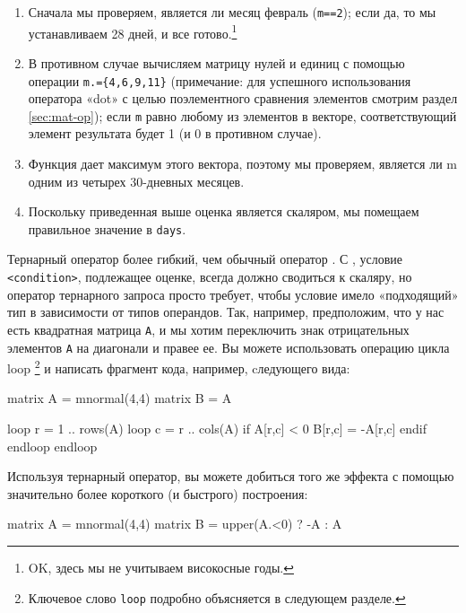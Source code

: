 \begin{enumerate}
\item Сначала мы проверяем, является ли месяц февраль (\texttt{m==2});
  если да, то мы устанавливаем 28 дней, и все готово.\footnote{OK,
    здесь мы не учитываем високосные годы.}
\item В противном случае вычисляем матрицу нулей и единиц с помощью
  операции \verb|m.={4,6,9,11}| (примечание: для успешного
  использования оператора «dot» с целью поэлементного сравнения
  элементов смотрим раздел \ref{sec:mat-op}); если \texttt{m} равно
  любому из элементов в векторе, соответствующий элемент результата
  будет 1 (и 0 в противном случае).
\item Функция  дает максимум этого вектора, поэтому мы
  проверяем, является ли m одним из четырех 30-дневных месяцев.
\item Поскольку приведенная выше оценка является скаляром, мы помещаем
  правильное значение в \texttt{days}.
\end{enumerate}
Тернарный оператор более гибкий, чем обычный оператор . С
, условие \texttt{<condition>}, подлежащее оценке, всегда
должно сводиться к скаляру, но оператор тернарного запроса просто
требует, чтобы условие имело «подходящий» тип в зависимости от типов
операндов. Так, например, предположим, что у нас есть квадратная
матрица \texttt{A}, и мы хотим переключить знак отрицательных
элементов \texttt{A} на диагонали и правее ее. Вы можете использовать
операцию цикла loop \footnote{Ключевое слово \texttt{loop} подробно
  объясняется в следующем разделе.}  и написать фрагмент кода,
например, cледующего вида:

\begin{code}
matrix A = mnormal(4,4)
matrix B = A

loop r = 1 .. rows(A)
  loop c = r .. cols(A)
     if A[r,c] < 0
       B[r,c] = -A[r,c]
     endif
  endloop
endloop
\end{code}

Используя тернарный оператор, вы можете добиться того же эффекта с
помощью значительно более короткого (и быстрого) построения:
\begin{code}
matrix A = mnormal(4,4)
matrix B = upper(A.<0) ? -A : A
\end{code}


